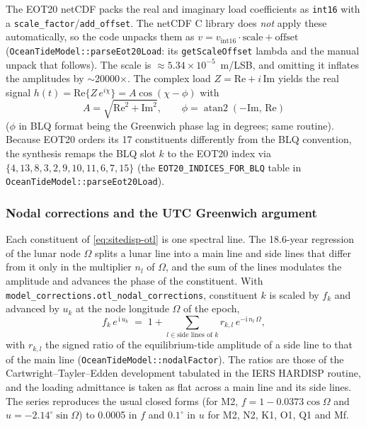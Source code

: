 \documentclass[main.tex]{subfiles}
\begin{document}
The EOT20 netCDF packs the real
and imaginary load coefficients as \texttt{int16} with a
\texttt{scale\_factor}/\texttt{add\_offset}.  The netCDF C library does
\emph{not} apply these automatically, so the code unpacks them as
$v = v_{\text{int16}}\cdot\text{scale} + \text{offset}$
(\texttt{OceanTideModel::parseEot20Load}: its \texttt{getScaleOffset}
lambda and the manual unpack that follows).  The scale is
$\approx 5.34\times10^{-5}$~m/LSB, and omitting it inflates the
amplitudes by $\sim$20000$\times$.  The complex load
$Z = \mathrm{Re} + i\,\mathrm{Im}$ yields the real signal
$h(t)=\mathrm{Re}\{Z\,e^{i\chi}\} = A\cos(\chi-\phi)$ with
\begin{equation}
A = \sqrt{\mathrm{Re}^2 + \mathrm{Im}^2},\qquad
\phi = \operatorname{atan2}(-\mathrm{Im},\,\mathrm{Re})
\label{eq:sitedisp-otl-blq}
\end{equation}
($\phi$ in BLQ format being the Greenwich phase lag in degrees; same
routine).  Because EOT20 orders its 17
constituents differently from the BLQ convention, the synthesis remaps
the BLQ slot $k$ to the EOT20 index via
$\{4,13,8,3,2,9,10,11,6,7,15\}$
(the \texttt{EOT20\_INDICES\_FOR\_BLQ} table in
\texttt{OceanTideModel::parseEot20Load}).

\subsubsection{Nodal corrections and the UTC Greenwich argument}
\label{sec:sitedisp-otl-nodal}

Each constituent of \eqref{eq:sitedisp-otl} is one spectral line.  The
18.6-year regression of the lunar node $\Omega$ splits a lunar line into
a main line and side lines that differ from it only in the multiplier
$n_l$ of $\Omega$, and the sum of the lines modulates the amplitude and
advances the phase of the constituent.  With
\texttt{model\_corrections.otl\_nodal\_corrections}, constituent $k$ is
scaled by $f_k$ and advanced by $u_k$ at the node longitude $\Omega$ of
the epoch,
\begin{equation}
f_k\,e^{\,\mathrm{i}\,u_k} \;=\; 1 + \sum_{l\in\text{side lines of }k} r_{k,l}\,e^{-\mathrm{i}\,n_l\,\Omega},
\label{eq:sitedisp-nodal}
\end{equation}
with $r_{k,l}$ the signed ratio of the equilibrium-tide amplitude of a
side line to that of the main line
(\texttt{OceanTideModel::nodalFactor}).  The ratios are those of the
Cartwright--Tayler--Edden development tabulated in the IERS HARDISP
routine, and the loading admittance is taken as flat across a main line
and its side lines.  The series reproduces the usual closed forms (for
M2, $f = 1 - 0.0373\cos\Omega$ and $u = -2.14^\circ\sin\Omega$) to 0.0005
in $f$ and $0.1^\circ$ in $u$ for M2, N2, K1, O1, Q1 and Mf.
\end{document}
